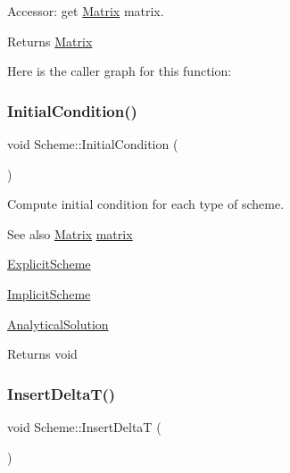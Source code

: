 Accessor\+: get \mbox{\hyperlink{class_matrix}{Matrix}} matrix. \begin{DoxyReturn}{Returns}
\mbox{\hyperlink{class_matrix}{Matrix}} 
\end{DoxyReturn}
Here is the caller graph for this function\+:
\mbox{\label{class_scheme_ad3546cda995629a2792629a072760ad2}} 
\subsubsection{\texorpdfstring{Initial\+Condition()}{InitialCondition()}}
{\footnotesize\ttfamily void Scheme\+::\+Initial\+Condition (\begin{DoxyParamCaption}{ }\end{DoxyParamCaption})\hspace{0.3cm}{\ttfamily [protected]}}

Compute initial condition for each type of scheme. \begin{DoxySeeAlso}{See also}
\mbox{\hyperlink{class_matrix}{Matrix}} \mbox{\hyperlink{class_scheme_a0e1fb8cb7e062d3f49715445a884f0e8}{matrix}} 

\mbox{\hyperlink{class_explicit_scheme}{Explicit\+Scheme}} 

\mbox{\hyperlink{class_implicit_scheme}{Implicit\+Scheme}} 

\mbox{\hyperlink{class_scheme_a7d3e9f8133a955517471eb7a6fea355f}{Analytical\+Solution}} 
\end{DoxySeeAlso}
\begin{DoxyReturn}{Returns}
void 
\end{DoxyReturn}
\mbox{\label{class_scheme_ac5803e4951dc125b274f543d5037c21d}} 
\subsubsection{\texorpdfstring{Insert\+Delta\+T()}{InsertDeltaT()}}
{\footnotesize\ttfamily void Scheme\+::\+Insert\+DeltaT (\begin{DoxyParamCaption}{ }\end{DoxyParamCaption})\hspace{0.3cm}{\ttfamily [protected]}}

